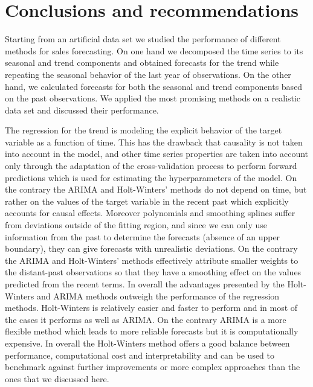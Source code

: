 \documentclass[12pt, letterpaper]{article}\usepackage[]{graphicx}\usepackage[]{color}
\begin{document}
\section{Conclusions and recommendations}

Starting from an artificial data set we studied the performance of different methods for sales forecasting. On one hand we decomposed the time series to its seasonal and trend components and obtained forecasts for the trend while repeating the seasonal behavior of the last year of observations. On the other hand, we calculated forecasts for both the seasonal and trend components based on the past observations. We applied the most promising methods on a realistic data set and discussed their performance. 

The regression for the trend is modeling the explicit behavior of the target variable as a function of time. This has the drawback that causality is not taken into account in the model, and other time series properties are taken into account only through the adaptation of the cross-validation process to perform forward predictions which is used for estimating the hyperparameters of the model. On the contrary the ARIMA and Holt-Winters' methods do not depend on time, but rather on the values of the target variable in the recent past which explicitly accounts for causal effects. Moreover polynomials and smoothing splines suffer from deviations outside of the fitting region, and since we can only use information from the past to determine the forecasts (absence of an upper boundary), they can give forecasts with unrealistic deviations. On the contrary the ARIMA and Holt-Winters' methods effectively attribute smaller weights to the distant-past observations so that they have a smoothing effect on the values predicted from the recent terms. In overall the advantages presented by the Holt-Winters and ARIMA methods outweigh the performance of the regression methods. Holt-Winters is relatively easier and faster to perform and in most of the cases it performs as well as ARIMA. On the contrary ARIMA is a more flexible method which leads to more reliable forecasts but it is computationally expensive. In overall the Holt-Winters method offers a good balance between performance, computational cost and interpretability and can be used to benchmark against further improvements or more complex approaches than the ones that we discussed here.
\end{document}
